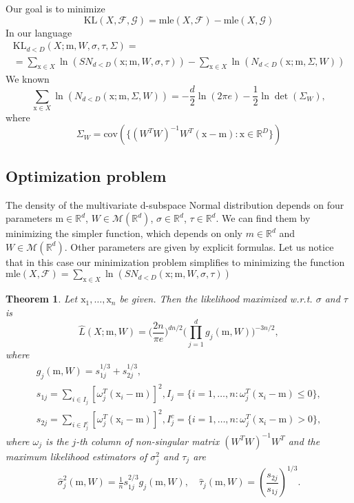 \documentclass[12pt]{article}
\def\R{\mathbb{R}}
\def\w{\omega}
\def\x{\mathrm{x}}
\def\m{\mathrm{m}}
\def\F{\mathcal{F}}
\def\G{\mathcal{G}}
\def\M{\mathcal{M}}
\def\KL{\mathrm{KL}}
\def\mle{\mathrm{mle}}
\def\cov{\mathrm{cov}}
\newtheorem{theorem}{Theorem}[section]
\theoremstyle{definition}
\begin{document}
Our goal is to minimize
$$
\KL(X,\F,\G)=\mle(X,\F)-\mle(X,\G) 
$$
In our language
\begin{equation}
\begin{array}{l}
\KL_{d<D}(X;\m,W,\sigma,\tau,\Sigma) = \\[6pt]
= \sum \limits_{\x \in X} \ln(SN_{d<D}(\x;\m,W,\sigma,\tau)) -
   \sum \limits_{\x \in X} \ln(N_{d<D}(\x;\m,\Sigma,W))
\end{array}
\end{equation}
We known
$$
\sum \limits_{\x \in X} \ln(N_{d<D}(\x;\m,\Sigma,W)) = -\frac{d}{2}\ln(2\pi e)-\frac{1}{2}\ln \det(\Sigma_{W}), 
$$
where 
$$
\Sigma_{W} = \cov( \{ (W^TW)^{-1}W^T(\x-\m) \colon \x \in \R^D\} )
$$

\subsection{Optimization problem}

The density of the multivariate d-subspace Normal distribution depends on four parameters $\m \in \R^d$, $W \in \M(\R^d)$, $\sigma \in \R^d$, $\tau \in \R^d$. 
We can find them by minimizing the simpler function, which depends on only  $m \in \R^d$ and $W \in \M(\R^d)$. Other parameters are given by explicit formulas. Let us notice that in this case our minimization problem simplifies to minimizing the function $\mle(X,\F) = \sum \limits_{\x \in X} \ln(SN_{d<D}(\x;\m,W,\sigma,\tau))$

\begin{theorem}\label{the:min}
Let $\x_1,\ldots,\x_n$ be given.  
Then the likelihood maximized w.r.t. $\sigma$ and $\tau$ is
\begin{equation}\label{eq:1}
 \hat{L}(X;\m,W) =   \bigg( \frac{2n}{\pi e} \bigg)^{dn/2} \bigg( \prod_{j=1}^{d} g_{j}(\m,W) \bigg)^{-3n/2},
\end{equation}
where
$$
\begin{array}{c}
{g}_{j}(\m,W) = {s}_{1j}^{1/3} + {s}_{2j}^{1/3},
\\[1ex]
{s}_{1j}= \! \sum\limits_{i \in I_j}[ \w_{j}^T (\x_i-\m)]^2,  {I}_j=\{ i = 1,\ldots,n \colon \w_{j}^T (\x_i-\m) \leq 0 \},
\\[1ex]
{s}_{2j}= \! \sum\limits_{i \in I_j^c}[ \w_{j}^T (\x_i-\m)]^2, {I}_j^c=\{ i = 1,\ldots,n \colon  \w_{j}^T (\x_i-\m) > 0 \},
\end{array}
$$
where $\omega_j$ is the $j$-th column of non-singular matrix $(W^TW)^{-1}W^T$ and the maximum likelihood estimators of $\sigma_{j}^2$ and $\tau_{j}$ are
$$\hat \sigma_j^2(\m,W) = \tfrac{1}{n} s_{1j}^{2/3} g_{j}(\m,W), \quad
\hat \tau_{j}(\m,W)=\left(\frac{s_{2j}}{s_{1j}}\right)^{1/3}.
$$
\end{theorem}
\end{document}
